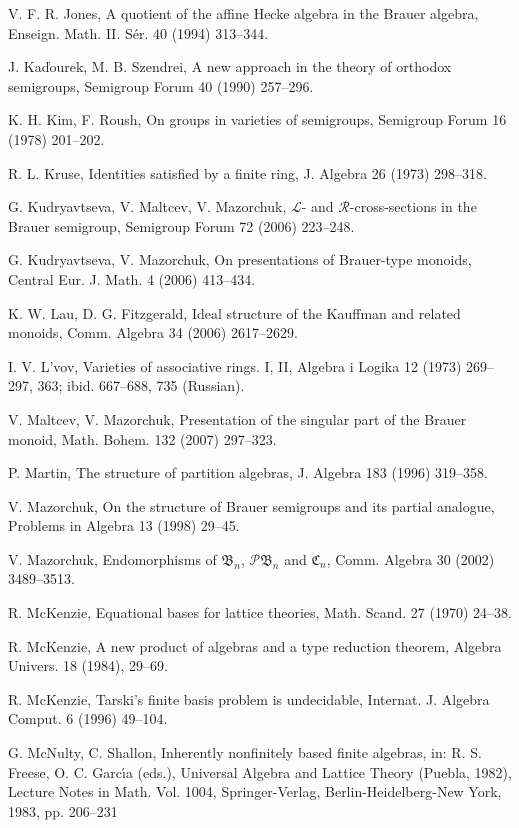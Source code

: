 \documentclass[preprint,1p,times]{elsarticle}
\numberwithin{equation}{section}
\theoremstyle{remark}
\def\C{\mathfrak{C}}
\def\B{\mathfrak{B}}
\begin{document}
\begin{thebibliography}{99}
V. F. R. Jones, A quotient of the affine Hecke algebra in the Brauer algebra, Enseign. Math. II. S\'er. 40 (1994)
313--344.

J. Ka\v{d}ourek, M. B. Szendrei, A new approach in the theory of orthodox semigroups, Semigroup Forum 40 (1990)
257--296.

K. H. Kim, F. Roush, On groups in varieties of semigroups, Semigroup Forum 16 (1978) 201--202.

R. L. Kruse, Identities satisfied by a finite ring, J. Algebra 26 (1973) 298--318.

G. Kudryavtseva, V. Maltcev, V. Mazorchuk, ${\mathcal L}$- and $\mathcal R$-cross-sections in the Brauer semigroup,
Semigroup Forum 72 (2006) 223--248.

G. Kudryavtseva, V. Mazorchuk, On presentations of Brauer-type monoids, Central Eur. J. Math. 4 (2006) 413--434.

K. W. Lau, D. G. Fitzgerald, Ideal structure of the Kauffman and related monoids, Comm. Algebra 34 (2006) 2617--2629.

I. V. L'vov, Varieties of associative rings. I, II, Algebra i Logika 12 (1973) 269--297, 363; ibid. 667--688, 735
(Russian).

V. Maltcev, V. Mazorchuk, Presentation of the singular part of the Brauer monoid, Math. Bohem. 132 (2007) 297--323.

P. Martin, The structure of partition algebras, J. Algebra 183 (1996) 319--358.

V. Mazorchuk, On the structure of Brauer semigroups and its partial analogue, Problems in Algebra 13 (1998) 29--45.

V. Mazorchuk, Endomorphisms of $\B_n$, ${\mathcal P}\B_n$ and $\C_n$, Comm. Algebra 30 (2002) 3489--3513.

R. McKenzie, Equational bases for lattice theories,  Math. Scand. 27 (1970) 24--38.

R. McKenzie, A new product of algebras and a type reduction theorem, Algebra Univers. 18 (1984), 29--69.

R. McKenzie, Tarski's finite basis problem is undecidable, Internat. J. Algebra Comput. 6 (1996) 49--104.

G. McNulty, C. Shallon, Inherently nonfinitely based finite algebras, in: R. S. Freese, O. C. Garc\'{\i}a (eds.),
Universal Algebra and Lattice Theory (Puebla, 1982), Lecture Notes in Math. Vol. 1004, Springer-Verlag,
Berlin-Heidelberg-New York, 1983, pp. 206--231


\end{thebibliography}
\end{document}
